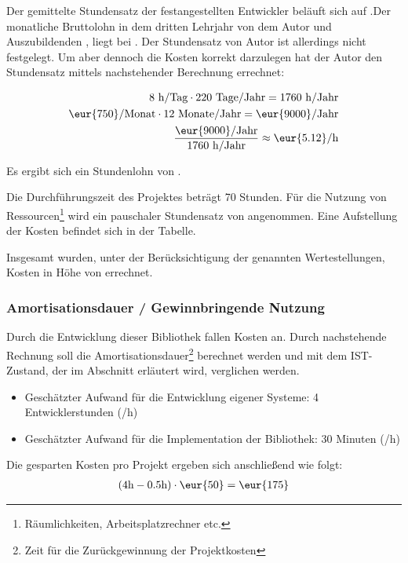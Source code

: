 Der gemittelte Stundensatz der festangestellten Entwickler beläuft sich auf
.\newline Der monatliche Bruttolohn in dem dritten Lehrjahr von dem
Autor und Auszubildenden \autor{}, liegt bei .
Der Stundensatz von Autor \autor{} ist allerdings nicht
festgelegt. Um aber dennoch die Kosten korrekt darzulegen hat der Autor \autor{}
den Stundensatz mittels nachstehender Berechnung errechnet:

\begin{eqnarray}
8 \mbox{ h/Tag} \cdot 220 \mbox{ Tage/Jahr} = 1760 \mbox{ h/Jahr}\\
\eur{750}\mbox{/Monat} \cdot 12 \mbox{ Monate/Jahr} = \eur{9000}
\mbox{/Jahr}\\
\frac{\eur{9000} \mbox{/Jahr}}{1760 \mbox{ h/Jahr}} \approx \eur{5.12}\mbox{/h}
\end{eqnarray}
\setcounter{equation}{0}

Es ergibt sich ein Stundenlohn von . 

Die Durchführungszeit des Projektes beträgt 70 Stunden. Für die Nutzung von
Ressourcen\footnote{Räumlichkeiten, Arbeitsplatzrechner etc.} wird ein
pauschaler Stundensatz von  angenommen.
Eine Aufstellung der Kosten befindet sich in
der Tabelle. 

Insgesamt wurden, unter der Berücksichtigung der genannten
Wertestellungen, Kosten in Höhe von  errechnet.

\subsubsection{Amortisationsdauer / Gewinnbringende Nutzung}
\label{sec:Amortisationsdauer}

Durch die Entwicklung dieser Bibliothek fallen Kosten an. Durch
nachstehende Rechnung soll die Amortisationsdauer\footnote{Zeit für die
Zurückgewinnung der Projektkosten} berechnet werden und mit dem IST-Zustand,
der im Abschnitt  erläutert wird, verglichen werden.

\begin{itemize}
	\item Geschätzter Aufwand für die Entwicklung eigener Systeme: 4
	Entwicklerstunden (/h)
	\item Geschätzter Aufwand für die Implementation der Bibliothek: 30 Minuten
	(/h)
\end{itemize}

Die gesparten Kosten pro Projekt ergeben sich anschließend wie
folgt:\begin{eqnarray} (4\mbox{h} - 0.5\mbox{h}) \cdot \eur{50} = \eur{175}
\end{eqnarray}
\setcounter{equation}{0}

